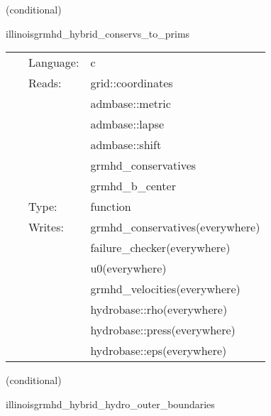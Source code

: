 \documentclass{article}
\begin{document}
\vspace{5mm}

   (conditional) 

\hspace{5mm} illinoisgrmhd\_hybrid\_conservs\_to\_prims 

\hspace{5mm}{\it hybrid version of illinoisgrmhd\_conservs\_to\_prims } 


\hspace{5mm}

 \begin{tabular*}{160mm}{cll} 
~ & Language:  & c \\ 
~ & Reads:  & grid::coordinates \\ 
~& ~ &admbase::metric\\ 
~& ~ &admbase::lapse\\ 
~& ~ &admbase::shift\\ 
~& ~ &grmhd\_conservatives\\ 
~& ~ &grmhd\_b\_center\\ 
~ & Type:  & function \\ 
~ & Writes:  & grmhd\_conservatives(everywhere) \\ 
~& ~ &failure\_checker(everywhere)\\ 
~& ~ &u0(everywhere)\\ 
~& ~ &grmhd\_velocities(everywhere)\\ 
~& ~ &hydrobase::rho(everywhere)\\ 
~& ~ &hydrobase::press(everywhere)\\ 
~& ~ &hydrobase::eps(everywhere)\\ 
\end{tabular*} 


\vspace{5mm}

   (conditional) 

\hspace{5mm} illinoisgrmhd\_hybrid\_hydro\_outer\_boundaries 

\hspace{5mm}{\it hybrid version of illinoisgrmhd\_outer\_boundaries } 


\hspace{5mm}
\end{document}
